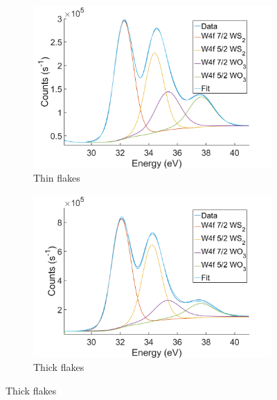 \begin{figure}[!h]
	\begin{center}
		\begin{subfigure}[b]{0.4\textwidth}
			\includegraphics[scale=0.2]{WSe2/XPSW4fThin.png}
			\caption{Thin flakes}
			\label{fig:WSe2XPSThinW}
		\end{subfigure}
		\qquad
		\begin{subfigure}[b]{0.4\textwidth}
			\includegraphics[scale=0.2]{WSe2/XPSW4fThick.png}
			\caption{Thick flakes}
			\label{fig:WSe2XPSThickW}
		\end{subfigure}
		

\end{center}
\end{figure}
